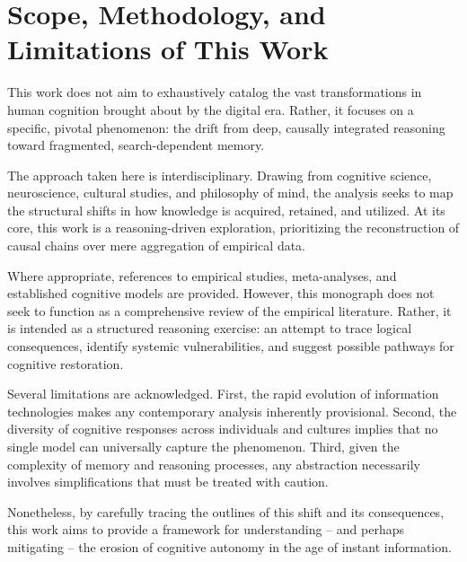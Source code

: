 \section{Scope, Methodology, and Limitations of This Work}

This work does not aim to exhaustively catalog the vast transformations
in human cognition brought about by the digital era. Rather, it focuses
on a specific, pivotal phenomenon: the drift from deep, causally
integrated reasoning toward fragmented, search-dependent memory.

The approach taken here is interdisciplinary. Drawing from cognitive
science, neuroscience, cultural studies, and philosophy of mind, the
analysis seeks to map the structural shifts in how knowledge is
acquired, retained, and utilized. At its core, this work is a
reasoning-driven exploration, prioritizing the reconstruction of causal
chains over mere aggregation of empirical data.

Where appropriate, references to empirical studies, meta-analyses, and
established cognitive models are provided. However, this monograph does
not seek to function as a comprehensive review of the empirical
literature. Rather, it is intended as a structured reasoning exercise:
an attempt to trace logical consequences, identify systemic
vulnerabilities, and suggest possible pathways for cognitive
restoration.

Several limitations are acknowledged. First, the rapid evolution of
information technologies makes any contemporary analysis inherently
provisional. Second, the diversity of cognitive responses across
individuals and cultures implies that no single model can universally
capture the phenomenon. Third, given the complexity of memory and
reasoning processes, any abstraction necessarily involves
simplifications that must be treated with caution.

Nonetheless, by carefully tracing the outlines of this shift and its
consequences, this work aims to provide a framework for understanding --
and perhaps mitigating -- the erosion of cognitive autonomy in the age of
instant information.
